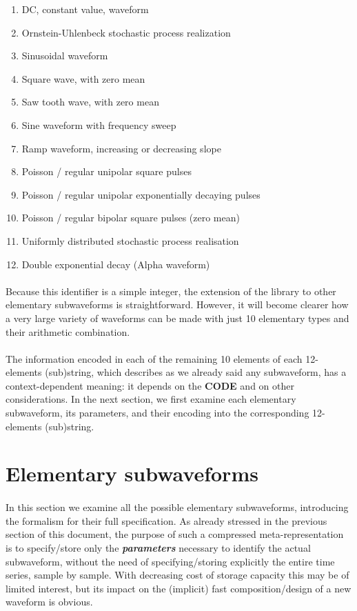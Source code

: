 \begin{enumerate}
\item DC, constant value, waveform
\item Ornstein-Uhlenbeck stochastic process realization
\item Sinusoidal waveform
\item Square wave, with zero mean
\item Saw tooth wave, with zero mean
\item Sine waveform with frequency sweep
\item Ramp waveform, increasing or decreasing slope
\item Poisson / regular unipolar square pulses
\item Poisson / regular unipolar exponentially decaying pulses
\item Poisson / regular bipolar square pulses (zero mean)
\item Uniformly distributed stochastic process realisation
\item Double exponential decay (Alpha waveform)
\end{enumerate}

\bigskip

\paragraph{}
Because this identifier is a simple integer, the extension of the library to other elementary subwaveforms is
straightforward. However, it will become clearer how a very large variety of waveforms can be made with just 10
elementary types and their arithmetic combination.

\paragraph{}
The information encoded in each of the remaining 10 elements of each 12-elements (sub)string, which describes as we
already said any subwaveform, has a context-dependent meaning: it depends on the \textbf{CODE} and on other
considerations. In the next section, we first examine each elementary subwaveform, its parameters, and their encoding
into the corresponding 12-elements (sub)string.


\section{Elementary subwaveforms}

\paragraph{}
In this section we examine all the possible elementary subwaveforms, introducing the formalism for their full
specification. As already stressed in the previous section of this document, the purpose of such a compressed
meta-representation is to specify/store only the \textbf{\textit{parameters}} necessary to identify the actual
subwaveform, without the need of specifying/storing explicitly the entire time series, sample by sample. With
decreasing cost of storage capacity this may be of limited interest, but its impact on the (implicit) fast
composition/design of a new waveform is obvious.

